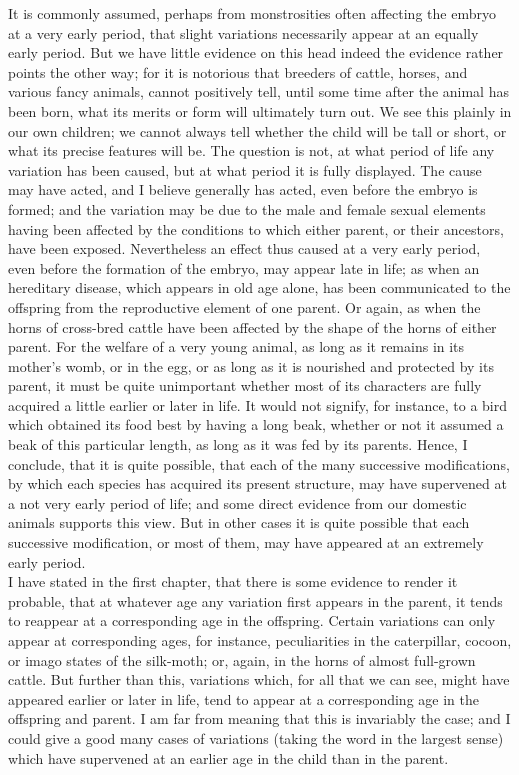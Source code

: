 \indent It is commonly assumed, perhaps from monstrosities often affecting the embryo at a very early period, that slight variations necessarily appear at an equally early period. But we have little evidence on this head indeed the evidence rather points the other way; for it is notorious that breeders of cattle, horses, and various fancy animals, cannot positively tell, until some time after the animal has been born, what its merits or form will ultimately turn out. We see this plainly in our own children; we cannot always tell whether the child will be tall or short, or what its precise features will be. The question is not, at what period of life any variation has been caused, but at what period it is fully displayed. The cause may have acted, and I believe generally has acted, even before the embryo is formed; and the variation may be due to the male and female sexual elements having been affected by the conditions to which either parent, or their ancestors, have been exposed. Nevertheless an effect thus caused at a very early period, even before the formation of the embryo, may appear late in life; as when an hereditary disease, which appears in old age alone, has been communicated to the offspring from the reproductive element of one parent. Or again, as when the horns of cross-bred cattle have been affected by the shape of the horns of either parent. For the welfare of a very young animal, as long as it remains in its mother's womb, or in the egg, or as long as it is nourished and protected by its parent, it must be quite unimportant whether most of its characters are fully acquired a little earlier or later in life. It would not signify, for instance, to a bird which obtained its food best by having a long beak, whether or not it assumed a beak of this particular length, as long as it was fed by its parents. Hence, I conclude, that it is quite possible, that each of the many successive modifications, by which each species has acquired its present structure, may have supervened at a not very early period of life; and some direct evidence from our domestic animals supports this view. But in other cases it is quite possible that each successive modification, or most of them, may have appeared at an extremely early period.~\\
\indent I have stated in the first chapter, that there is some evidence to render it probable, that at whatever age any variation first appears in the parent, it tends to reappear at a corresponding age in the offspring. Certain variations can only appear at corresponding ages, for instance, peculiarities in the caterpillar, cocoon, or imago states of the silk-moth; or, again, in the horns of almost full-grown cattle. But further than this, variations which, for all that we can see, might have appeared earlier or later in life, tend to appear at a corresponding age in the offspring and parent. I am far from meaning that this is invariably the case; and I could give a good many cases of variations (taking the word in the largest sense) which have supervened at an earlier age in the child than in the parent.~\\
